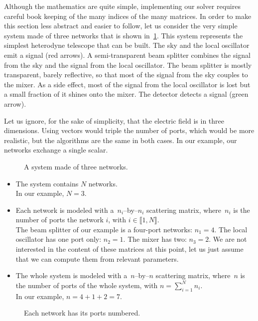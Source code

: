 Although the mathematics are quite simple, implementing our solver requires careful book keeping of the many indices of the many matrices.
In order to make this section less abstract and easier to follow, let us consider the very simple system made of three networks that is shown in~\cref{fig:implementation_0}.
This system represents the simplest heterodyne telescope that can be built.
The sky and the local oscillator emit a signal (red arrows).
A semi-transparent beam splitter combines the signal from the sky and the signal from the local oscillator.
The beam splitter is mostly transparent, barely reflective, so that most of the signal from the sky couples to the mixer.
As a side effect, most of the signal from the local oscillator is lost but a small fraction of it shines onto the mixer.
The detector detects a signal (green arrow).

Let us ignore, for the sake of simplicity, that the electric field is in three dimensions.
Using vectors would triple the number of ports, which would be more realistic, but the algorithms are the same in both cases.
In our example, our networks exchange a single scalar.

\begin{figure}[hbtp]
    \centering
    
    \caption{A system made of three networks.}
    \label{fig:implementation_0}
\end{figure}

\begin{itemize}
    \item 
The system contains $N$ networks.
\\In our example, $N=3$.
    \item 
Each network is modeled with a~$n_i$--by--$n_i$ scattering matrix, where~$n_i$ is the number of ports the network $i$, with $i \in \llbracket 1, N \rrbracket$.
\\
The beam splitter of our example is a four-port networks: $n_1=4$.
The local oscillator has one port only: $n_2=1$.
The mixer has two: $n_3=2$.
We are not interested in the content of these matrices at this point, let us just assume that we can compute them from relevant parameters.
    \item 
The whole system is modeled with a~$n$--by--$n$ scattering matrix, where~$n$ is the number of ports of the whole system, with $n = \sum_{i=1}^N n_i$.
\\
In our example, $n=4+1+2=7$.
\end{itemize}

\begin{figure}[hbtp]
    \centering
    
    \caption{Each network has its ports numbered.}
    \label{fig:implementation_1}
\end{figure}



